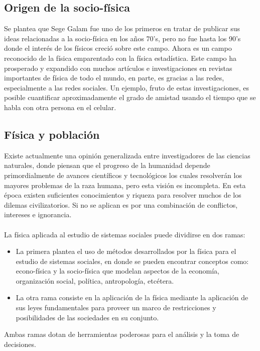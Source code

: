 \subsection*{Origen de la socio-física}
Se plantea que Sege Galam fue uno de los primeros en tratar de publicar sus ideas relacionadas a la socio-física en los años 70's, pero no fue hasta los 90's donde el interés de los físicos creció sobre este campo. Ahora es un campo reconocido de la física emparentado con la física estadística. Este campo ha prosperado y expandido con muchos artículos e investigaciones en revistas importantes de física de todo el mundo, en parte, es gracias a las redes, especialmente a las redes sociales.\cite{Galam.1986} Un ejemplo, fruto de estas investigaciones, es posible cuantificar aproximadamente el grado de amistad usando el tiempo que se habla con otra persona en el celular.\cite{OctavioMiramontes2013}

\subsection*{Física y población}
Existe actualmente una opinión generalizada entre investigadores de las ciencias naturales, donde piensan que el progreso de la humanidad depende primordialmente de avances científicos y tecnológicos los cuales resolverán los mayores problemas de la raza humana, pero esta visión es incompleta. En esta época existen suficientes conocimientos y riqueza para resolver muchos de los dilemas civilizatorios. Si no se aplican es por una combinación de conflictos, intereses e ignorancia. \cite{OctavioMiramontes2013}
\\
\\
La física aplicada al estudio de sistemas sociales puede dividirse en dos ramas: 
\begin{itemize}
    \item La primera plantea el uso de métodos desarrollados por la física para el estudio de sistemas sociales, en donde se pueden encontrar conceptos como: econo-física y la socio-física que modelan aspectos de la economía, organización social, política, antropología, etcétera.
    \item La otra rama consiste en la aplicación de la física mediante la aplicación de sus leyes fundamentales para proveer un marco de restricciones y posibilidades de las sociedades en su conjunto.
\end{itemize}
Ambas ramas dotan de herramientas poderosas para el análisis y la toma de decisiones. \cite{OctavioMiramontes2013}

